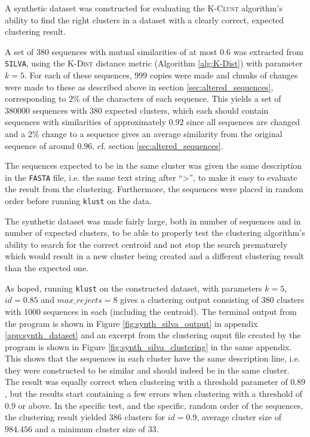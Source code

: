 A synthetic dataset was constructed for evaluating the \textsc{K-Clust}
algorithm's ability to find the right clusters in a dataset with a clearly
correct, expected clustering result.

A set of $380$ sequences with mutual similarities of at most $0.6$ was
extracted from \texttt{SILVA}, using the \textsc{K-Dist} distance metric
(Algorithm \ref{alg:K-Dist}) with parameter $k=5$. For each of these
sequences, $999$ copies were made and chunks of changes were made to these as
described above in section \ref{sec:altered_sequences}, corresponding to $2$\%
of the characters of each sequence. This yields a set of \num{380000}
sequences with $380$ expected clusters, which each should contain sequences
with similarities of approximately $0.92$ since all sequences are changed and
a $2$\% change to a sequence gives an average similarity from the original
sequence of around $0.96$, cf. section \ref{sec:altered_sequences}.

The sequences expected to be in the same cluster was given the same description
in the \texttt{FASTA} file, i.e. the same text string after ``>'', to make it
easy to evaluate the result from the clustering. Furthermore, the sequences
were placed in random order before running \texttt{klust} on the data.

The synthetic dataset was made fairly large, both in number of sequences and in
number of expected clusters, to be able to properly test the clustering
algorithm's ability to search for the correct centroid and not stop the search
prematurely which would result in a new cluster being created and a different
clustering result than the expected one.

As hoped, running \texttt{klust} on the constructed dataset, with parameters
$k=5$, $id=0.85$ and $max\_rejects=8$ gives a clustering output consisting of
$380$ clusters with 1000 sequences in each (including the centroid). The
terminal output from the program is shown in Figure
\ref{fig:synth_silva_output} in appendix \ref{app:synth_dataset} and an
excerpt from the clustering ouput file created by the program is shown in
Figure \ref{fig:synth_silva_clustering} in the same appendix. This shows that
the sequences in each cluster have the same description line, i.e. they were
constructed to be similar and should indeed be in the same cluster. The result
was equally correct when clustering with a threshold parameter of $0.89$, but
the results start containing a few errors when clustering with a threshold of
$0.9$ or above. In the specific test, and the specific, random order of the
sequences, the clustering result yielded $386$ clusters for $id=0.9$, average
cluster size of $984.456$ and a minimum cluster size of $33$.

